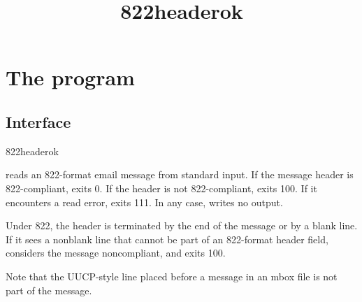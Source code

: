 \documentclass{book}
\title{822headerok}
\begin{document}
\section{The  program}

\subsection{Interface}
\begin{code}%
  822headerok
\end{code}

 reads an 822-format email message from standard
input.  If the message header is 822-compliant, 
exits 0.  If the header is not 822-compliant,  exits
100.  If it encounters a read error,  exits 111.  In
any case,  writes no output.

Under 822, the header is terminated by the end of the message or by a
blank line.  If it sees a nonblank line that cannot be part of an
822-format header field,  considers the message
noncompliant, and exits 100.

Note that the UUCP-style  line placed before a message
in an mbox file is not part of the message.
\end{document}
